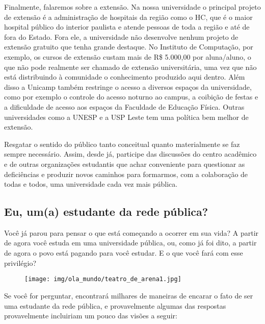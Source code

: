Finalmente, falaremos sobre a extensão. Na nossa universidade o principal
projeto de extensão é a administração de hospitais da região como o HC, que é o
maior hospital público do interior paulista e atende pessoas de toda a região e
até de fora do Estado. Fora ele, a universidade não desenvolve nenhum projeto
de extensão gratuito que tenha grande destaque. No Instituto de Computação, por
exemplo, os cursos de extensão custam mais de R\$ 5.000,00 por aluna/aluno, o
que não pode realmente ser chamado de extensão universitária, uma vez que não
está distribuindo à comunidade o conhecimento produzido aqui dentro. Além disso
a Unicamp também restringe o acesso a diversos espaços da universidade, como
por exemplo o controle do acesso noturno ao campus, a coibição de festas e a
dificuldade de acesso aos espaços da Faculdade de Educação Física. Outras
universidades como a UNESP e a USP Leste tem uma política bem melhor de
extensão.

Resgatar o sentido do público tanto conceitual quanto materialmente se faz
sempre necessário. Assim, desde já, participe das discussões do centro
acadêmico e de outras organizações estudantis que achar conveniente para
questionar as deficiências e produzir novos caminhos para formarmos, com a
colaboração de todas e todos, uma universidade cada vez mais pública.

\subsection*{Eu, um(a) estudante da rede pública?}

Você já parou para pensar o que está começando a ocorrer em sua vida? A partir
de agora você estuda em uma universidade pública, ou, como já foi dito, a
partir de agora o povo está pagando para você estudar. E o que você fará com
esse privilégio?

\begin{figure}[h!]
  \centering
  \texttt{[image: img/ola\_mundo/teatro\_de\_arena1.jpg]}
\end{figure}

Se você for perguntar, encontrará milhares de maneiras de encarar o fato de ser
uma estudante da rede pública, e provavelmente algumas das respostas
provavelmente incluiriam um pouco das visões a seguir:

